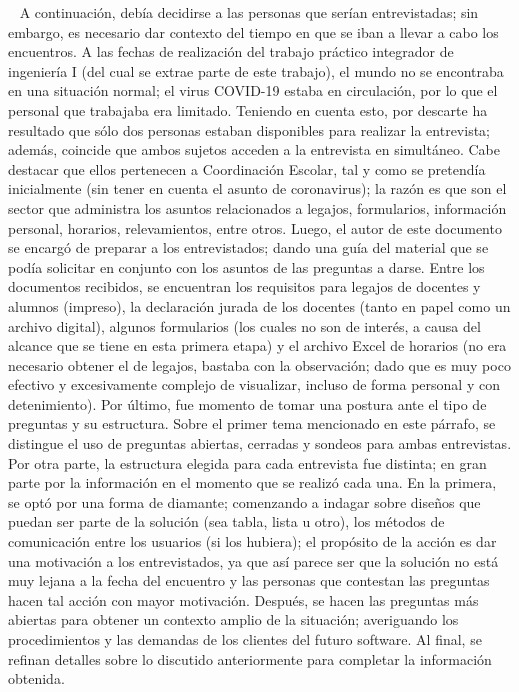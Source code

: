 \ \newline
\normalsize{ \indent
A continuación, debía decidirse a las personas que serían
entrevistadas; sin embargo, es necesario dar contexto del
tiempo en que se iban a llevar a cabo los encuentros. A las
fechas de realización del trabajo práctico integrador de
ingeniería I (del cual se extrae parte de este trabajo), el
mundo no se encontraba en una situación normal; el virus
COVID-19 estaba en circulación, por lo que el personal que
trabajaba era limitado. Teniendo en cuenta esto, por descarte
ha resultado que sólo dos personas estaban disponibles para
realizar la entrevista; además, coincide que ambos sujetos
acceden a la entrevista en simultáneo. Cabe destacar que ellos
pertenecen a Coordinación Escolar, tal y como se pretendía
inicialmente (sin tener en cuenta el asunto de coronavirus);
la razón es que son el sector que administra los asuntos
relacionados a legajos, formularios, información personal,
horarios, relevamientos, entre otros.
}
\newline
\normalsize{ \indent
Luego, el autor de este documento se encargó de preparar a los
entrevistados; dando una guía del material que se podía
solicitar en conjunto con los asuntos de las preguntas a
darse. Entre los documentos recibidos, se encuentran los
requisitos para legajos de docentes y alumnos (impreso),
la declaración jurada de los docentes (tanto en papel como
un archivo digital), algunos formularios (los cuales no son
de interés, a causa del alcance que se tiene en esta primera
etapa) y el archivo Excel de horarios (no era necesario
obtener el de legajos, bastaba con la observación; dado que
es muy poco efectivo y excesivamente complejo de visualizar,
incluso de forma personal y con detenimiento).
}
\newline
\normalsize{ \indent
Por último, fue momento de tomar una postura ante el tipo
de preguntas y su estructura. Sobre el primer tema mencionado
en este párrafo, se distingue el uso de preguntas abiertas,
cerradas y sondeos para ambas entrevistas. Por otra parte,
la estructura elegida para cada entrevista fue distinta; en
gran parte por la información en el momento que se realizó
cada una.
}
\newline
\normalsize{ \indent
En la primera, se optó por una forma de diamante; comenzando
a indagar sobre diseños que puedan ser parte de la solución
(sea tabla, lista u otro), los métodos de comunicación entre
los usuarios (si los hubiera); el propósito de la acción es
dar una motivación a los entrevistados, ya que así parece ser
que la solución no está muy lejana a la fecha del encuentro y
las personas que contestan las preguntas hacen tal acción con
mayor motivación. Después, se hacen las preguntas más abiertas
para obtener un contexto amplio de la situación; averiguando
los procedimientos y las demandas de los clientes del futuro
software. Al final, se refinan detalles sobre lo discutido
anteriormente para completar la información obtenida.
}
